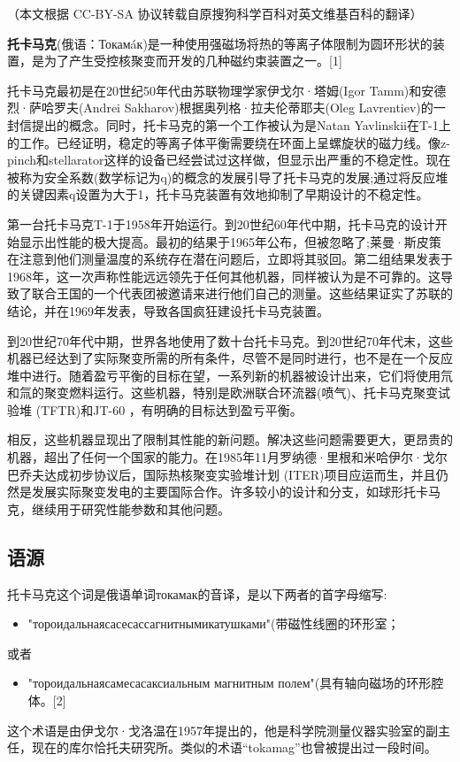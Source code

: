 
（本文根据 CC-BY-SA 协议转载自原搜狗科学百科对英文维基百科的翻译）

\textbf{托卡马克}(俄语：Токамáк)是一种使用强磁场将热的等离子体限制为圆环形状的装置，是为了产生受控核聚变而开发的几种磁约束装置之一。[1]

托卡马克最初是在20世纪50年代由苏联物理学家伊戈尔·塔姆(Igor Tamm)和安德烈·萨哈罗夫(Andrei Sakharov)根据奥列格·拉夫伦蒂耶夫(Oleg Lavrentiev)的一封信提出的概念。同时，托卡马克的第一个工作被认为是Natan Yavlinskii在T-1上的工作。已经证明，稳定的等离子体平衡需要绕在环面上呈螺旋状的磁力线。像z-pinch和stellarator这样的设备已经尝试过这样做，但显示出严重的不稳定性。现在被称为安全系数(数学标记为q)的概念的发展引导了托卡马克的发展;通过将反应堆的关键因素q设置为大于1，托卡马克装置有效地抑制了早期设计的不稳定性。

第一台托卡马克T-1于1958年开始运行。到20世纪60年代中期，托卡马克的设计开始显示出性能的极大提高。最初的结果于1965年公布，但被忽略了;莱曼·斯皮策在注意到他们测量温度的系统存在潜在问题后，立即将其驳回。第二组结果发表于1968年，这一次声称性能远远领先于任何其他机器，同样被认为是不可靠的。这导致了联合王国的一个代表团被邀请来进行他们自己的测量。这些结果证实了苏联的结论，并在1969年发表，导致各国疯狂建设托卡马克装置。

到20世纪70年代中期，世界各地使用了数十台托卡马克。到20世纪70年代末，这些机器已经达到了实际聚变所需的所有条件，尽管不是同时进行，也不是在一个反应堆中进行。随着盈亏平衡的目标在望，一系列新的机器被设计出来，它们将使用氘和氚的聚变燃料运行。这些机器，特别是欧洲联合环流器(喷气)、托卡马克聚变试验堆 (TFTR)和JT-60 ，有明确的目标达到盈亏平衡。

相反，这些机器显现出了限制其性能的新问题。解决这些问题需要更大，更昂贵的机器，超出了任何一个国家的能力。在1985年11月罗纳德·里根和米哈伊尔·戈尔巴乔夫达成初步协议后，国际热核聚变实验堆计划 (ITER)项目应运而生，并且仍然是发展实际聚变发电的主要国际合作。许多较小的设计和分支，如球形托卡马克，继续用于研究性能参数和其他问题。

\subsection{语源}
托卡马克这个词是俄语单词токамак的音译，是以下两者的首字母缩写:
\begin{itemize}
\item "тороидальнаясасесассагнитнымикатушками"(带磁性线圈的环形室；
\end{itemize}
或者
\begin{itemize}
\item "тороидальнаясамесасаксиальным магнитным полем"(具有轴向磁场的环形腔体。[2]
\end{itemize}
这个术语是由伊戈尔·戈洛温在1957年提出的，他是科学院测量仪器实验室的副主任，现在的库尔恰托夫研究所。类似的术语“tokamag”也曾被提出过一段时间。


